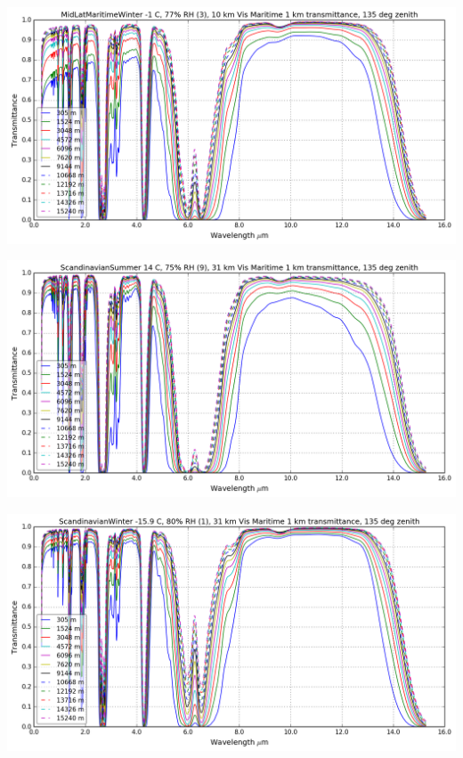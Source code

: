 \documentclass{workpackage}
\begin{document}
\begin{center}
\includegraphics{./pic/Analyse-Standard-Atmospheres_17_4.png}
\end{center}

\begin{center}
\includegraphics{./pic/Analyse-Standard-Atmospheres_17_5.png}
\end{center}

\begin{center}
\includegraphics{./pic/Analyse-Standard-Atmospheres_17_6.png}
\end{center}
\end{document}
